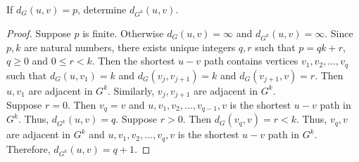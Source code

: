 \begin{exercise}
	If $d_G(u,v) = p$, determine $d_{G^k}(u,v)$.
\end{exercise}
\begin{proof}
	Suppose $p$ is finite. Otherwise $d_G(u,v) = \infty$ and  $d_{G^k}(u,v) = \infty$.
	Since $p,k$ are natural numbers, there exists unique integers $q,r$ such that $p = qk+r$, $q \ge 0$ and $0 \le r < k$. Then the shortest $u-v$ path contains vertices $v_1,v_2,\dots,v_q$ such that $d_G(u,v_1) = k$ and $d_G(v_j,v_{j+1}) = k$ and $d_G(v_{j+1},v) = r$. Then $u,v_1$ are adjacent in $G^k$. Similarly, $v_j,v_{j+1}$ are adjacent in $G^k$.\\

	Suppose $r = 0$. Then $v_q = v$ and $u,v_1,v_2,\dots,v_{q-1},v$ is the shortest $u-v$ path in $G^k$. Thus, $d_{G^k}(u,v) = q$. Suppose $r > 0$. Then $d_G(v_q,v) = r < k$. Thus, $v_q,v$ are adjacent in $G^k$ and $u,v_1,v_2,\dots,v_q,v$ is the shortest $u-v$ path in $G^k$. Therefore, $d_{G^k}(u,v) = q+1$.
\end{proof}

\setcounter{subsection}{11}

